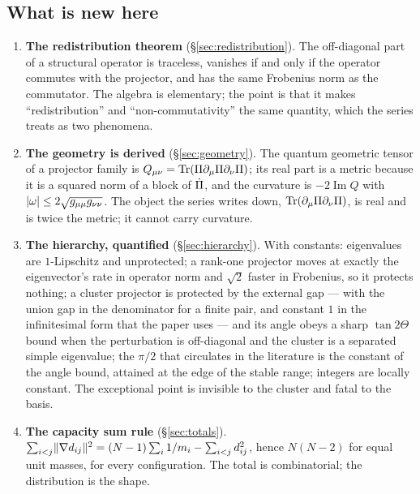 \subsection{What is new here}

\begin{enumerate}[label=\textbf{C\arabic*.},leftmargin=2.2em]
\item \textbf{The redistribution theorem} (\S\ref{sec:redistribution}). The off-diagonal part of
a structural operator is traceless, vanishes if and only if the operator commutes with the
projector, and has the same Frobenius norm as the commutator. The algebra is elementary; the
point is that it makes ``redistribution'' and ``non-commutativity'' the same quantity, which the
series treats as two phenomena.

\item \textbf{The geometry is derived} (\S\ref{sec:geometry}). The quantum geometric tensor of a
projector family is $Q_{\mu\nu}=\operatorname{Tr}(\Pi\partial_\mu\Pi\partial_\nu\Pi)$; its real part is a metric
because it is a squared norm of a block of $\dot{\Pi}$, and the curvature is $-2\operatorname{Im}Q$
with $\lvert\omega\rvert\le2\sqrt{g_{\mu\mu}g_{\nu\nu}}$. The object the series writes down,
$\operatorname{Tr}(\partial_\mu\Pi\partial_\nu\Pi)$, is real and is twice the metric; it cannot carry curvature.

\item \textbf{The hierarchy, quantified} (\S\ref{sec:hierarchy}). With constants: eigenvalues are
$1$-Lipschitz and unprotected; a rank-one projector moves at exactly the eigenvector's rate in
operator norm and $\sqrt2$ faster in Frobenius, so it protects nothing; a cluster projector is
protected by the external gap --- with the union gap in the denominator for a finite pair, and
constant $1$ in the infinitesimal form that the paper uses --- and its angle obeys a sharp
$\tan 2\Theta$ bound when the perturbation is off-diagonal and the cluster is a separated simple
eigenvalue; the $\pi/2$ that circulates in the
literature is the constant of the angle bound, attained at the edge of the stable range;
integers are locally constant. The exceptional point is invisible to the cluster and fatal to the basis.

\item \textbf{The capacity sum rule} (\S\ref{sec:totals}). $\sum_{i<j}\lVert\nabla d_{ij}\rVert^2
=(N-1)\sum_i1/m_i-\sum_{i<j}d_{ij}^2$, hence $N(N-2)$ for equal unit masses, for every
configuration. The total is combinatorial; the distribution is the shape.


\end{enumerate}
